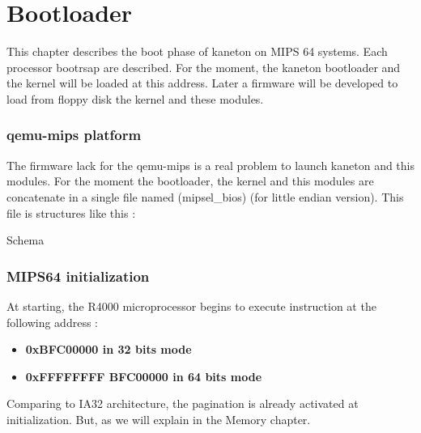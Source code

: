 %
%
%
%
%
%

%
%

\chapter{Bootloader}

This chapter describes the boot phase of kaneton on MIPS 64 systems. Each processor bootrsap are described. For the moment, the kaneton bootloader and the kernel will be loaded at this address. Later a firmware will be developed to load from floppy disk the kernel and these modules.

\subsection{qemu-mips platform}

The firmware lack for the qemu-mips is a real problem to launch kaneton and this modules.
For the moment the bootloader, the kernel and this modules are concatenate in a single file
named \location(mipsel\_bios) (for little endian version). This file is structures like this :

Schema

\subsection{MIPS64 initialization}

At starting, the R4000 microprocessor begins to execute instruction at the following address :

\begin{itemize}
  \item
    \textbf{0xBFC00000 in 32 bits mode}
  \item
    \textbf{0xFFFFFFFF BFC00000 in 64 bits mode}
\end{itemize}

Comparing to IA32 architecture, the pagination is already activated at initialization. But, as we will explain in the Memory chapter.
